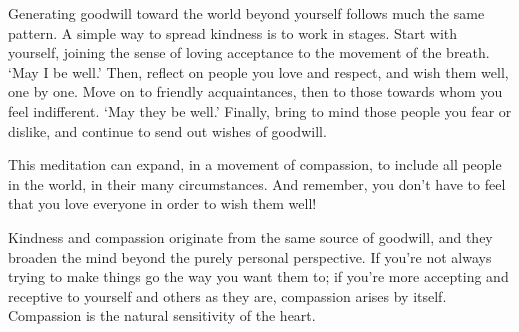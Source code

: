 Generating goodwill toward the world beyond yourself follows much the
same pattern. A simple way to spread kindness is to work in stages.\linebreak
Start with yourself, joining the sense of loving acceptance to the
movement of the breath. `May I be well.' Then, reflect on people you
love and respect, and wish them well, one by one. Move on to friendly
acquaintances, then to those towards whom you feel indifferent. `May
they be well.' Finally, bring to mind those people you fear or dislike,
and continue to send out wishes of goodwill.

This meditation can expand, in a movement of compassion, to include all
people in the world, in their many circumstances. And remember, you
don't have to feel that you love everyone in order to wish them well!

Kindness and compassion originate from the same source of goodwill, and
they broaden the mind beyond the purely personal perspective. If you're
not always trying to make things go the way you want them to; if you're
more accepting and receptive to yourself and others as they are,
compassion arises by itself. Compassion is the natural sensitivity of
the heart.

